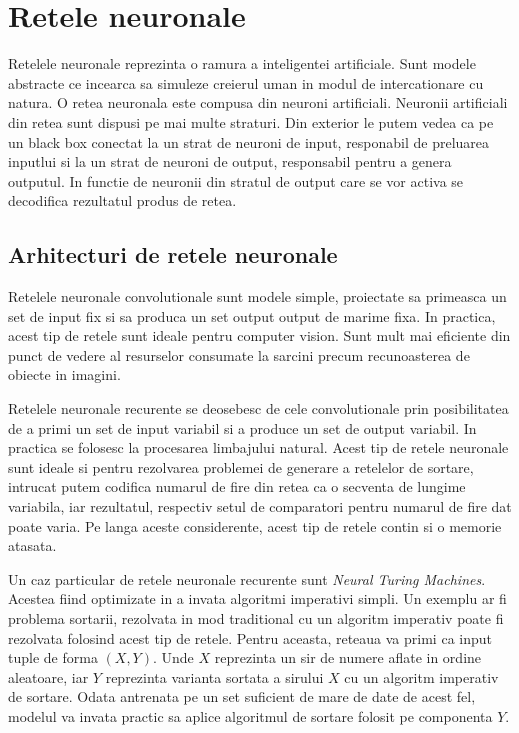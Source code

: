 \documentclass[12pt]{article}
\begin{document}
\section{Retele neuronale}

Retelele neuronale reprezinta o ramura a inteligentei artificiale. Sunt modele abstracte ce incearca sa simuleze creierul uman
in modul de intercationare cu natura. O retea neuronala este compusa din neuroni artificiali. Neuronii artificiali din retea sunt dispusi pe mai multe straturi. Din exterior le putem vedea ca pe un black box conectat la un strat de neuroni de input, responabil de preluarea inputlui si la un strat de neuroni de output, responsabil pentru a genera outputul. In functie de neuronii din stratul de output care se vor activa se decodifica rezultatul produs de retea.

\subsection{Arhitecturi de retele neuronale}
Retelele neuronale convolutionale sunt modele simple, proiectate sa primeasca un set de input fix si sa produca un set output output de marime fixa. In practica, acest tip de retele sunt ideale pentru computer vision. Sunt mult mai eficiente din punct de vedere al resurselor consumate la sarcini precum recunoasterea de obiecte in imagini. 

Retelele neuronale recurente se deosebesc de cele convolutionale prin posibilitatea de a primi un set de input variabil si a produce un set de output variabil. In practica se folosesc la procesarea limbajului natural. Acest tip de retele neuronale sunt ideale si pentru rezolvarea problemei de generare a retelelor de sortare, intrucat putem codifica numarul de fire din retea ca o secventa de lungime variabila, iar rezultatul, respectiv setul de comparatori pentru numarul de fire dat poate varia. Pe langa aceste considerente, acest tip de retele contin si o memorie atasata.

Un caz particular de retele neuronale recurente sunt \textit{Neural Turing Machines}. Acestea fiind optimizate in a invata algoritmi imperativi simpli. Un exemplu ar fi problema sortarii, rezolvata in mod traditional cu un algoritm imperativ poate fi rezolvata folosind acest tip de retele. Pentru aceasta, reteaua va primi ca input tuple de forma $(X, Y)$. Unde $X$ reprezinta un sir de numere aflate in ordine aleatoare, iar $Y$ reprezinta varianta sortata a sirului $X$ cu un algoritm imperativ de sortare. Odata antrenata pe un set suficient de mare de date de acest fel, modelul va invata practic sa aplice algoritmul de sortare folosit pe componenta $Y$. 
\end{document}
